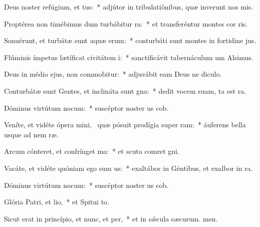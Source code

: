 \item Deus noster refúgium, et tus:~* adjútor in tribulatiónibus, quæ inverunt nos mis.
\item Proptérea non timébimus dum turbábitur ra:~* et transferéntur montes  cor ris.
\item Sonuérunt, et turbátæ sunt aquæ erum:~* conturbáti sunt montes in fortidine jus.
\item Flúminis ímpetus lætíficat civitátem i:~* sanctificávit tabernáculum um Alsimus.
\item Deus in médio ejus, non commobitur:~* adjuvábit eam Deus ne diculo.
\item Conturbátæ sunt Gentes, et inclináta sunt gna:~* dedit vocem suam, ta est ra.
\item Dóminus virtútum nocum:~* suscéptor noster us cob.
\item Veníte, et vidéte ópera mini,~\pscross{} quæ pósuit prodígia super ram:~* áuferens bella usque ad nem ræ.
\item Arcum cónteret, et confrínget ma:~* et scuta comret gni.
\item Vacáte, et vidéte quóniam ego sum us:~* exaltábor in Géntibus, et exalbor in ra.
\item Dóminus virtútum nocum:~* suscéptor noster us cob.
\item Glória Patri, et lio,~* et Spitui to.
\item Sicut erat in princípio, et nunc, et per,~* et in sǽcula sæcurum. men.

